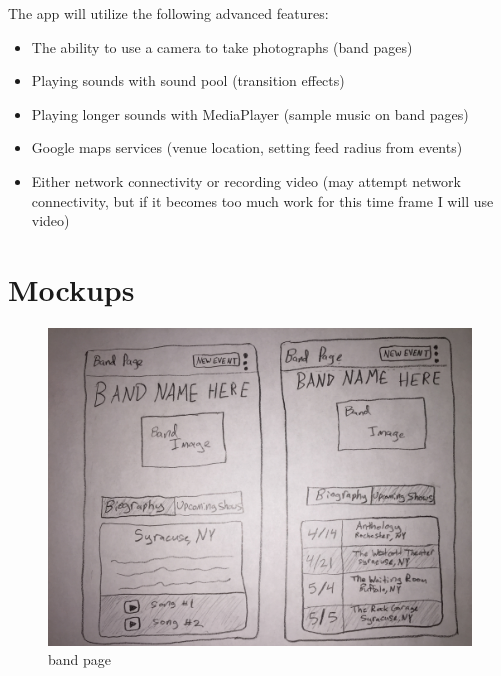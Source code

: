 \documentclass[a4paper]{article}
\begin{document}
The app will utilize the following advanced features:

\begin{itemize}
  \item The ability to use a camera to take photographs (band pages)
  \item Playing sounds with sound pool (transition effects)
  \item Playing longer sounds with MediaPlayer (sample music on band pages)
  \item Google maps services (venue location, setting feed radius from events)
  \item Either network connectivity or recording video (may attempt network connectivity, but if it becomes too much work for this time frame I will use video)
\end{itemize}

\section{Mockups}

\begin{figure}[H]
  \centering
  \begin{minipage}[b]{0.85\textwidth}
    \includegraphics[width=\textwidth]{band_page.jpg}
    \caption{band page}
  \end{minipage}
\end{figure}
\end{document}

